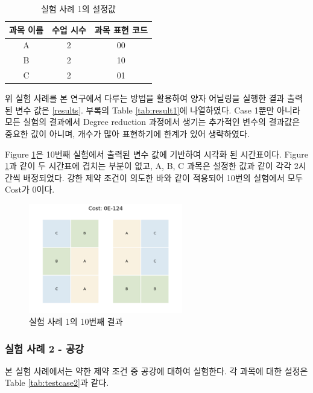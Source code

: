 \documentclass{article}
\begin{document}
    \begin{table}[htb!]
        \centering
        \begin{tabular}{c c c}
             \hline
             과목 이름 & 수업 시수 & 과목 표현 코드\\
             \hline
             A & 2 & 00 \\
             B & 2 & 10 \\
             C & 2 & 01 \\
             \hline
        \end{tabular}
        \caption{실험 사례 1의 설정값}\label{tab:testcase1}
    \end{table}

위 실험 사례를 본 연구에서 다루는 방법을 활용하여 양자 어닐링을 실행한 결과 출력된 변수 값은 \ref{results}. 부록의 Table \ref{tab:result1}에 나열하였다. Case 1뿐만 아니라 모든 실험의 결과에서 Degree reduction 과정에서 생기는 추가적인 변수의 결과값은 중요한 값이 아니며, 개수가 많아 표현하기에 한계가 있어 생략하였다.

Figure \ref{fig:case1}은 10번째 실험에서 출력된 변수 값에 기반하여 시각화 된 시간표이다. Figure \ref{fig:case1}과 같이 두 시간표에 겹치는 부분이 없고, A, B, C 과목은 설정한 값과 같이 각각 2시간씩 배정되었다. 강한 제약 조건이 의도한 바와 같이 적용되어 10번의 실험에서 모두 Cost가 0이다.

    \begin{figure}[htb!]
        \centering
        \includegraphics[width=0.6\textwidth]{images/Case1.png}
        \caption{실험 사례 1의 10번째 결과}
        \label{fig:case1}
    \end{figure}

    \subsubsection{실험 사례 2 - 공강}

본 실험 사례에서는 약한 제약 조건 중 공강에 대하여 실험한다. 각 과목에 대한 설정은 Table \ref{tab:testcase2}과 같다.
\end{document}
